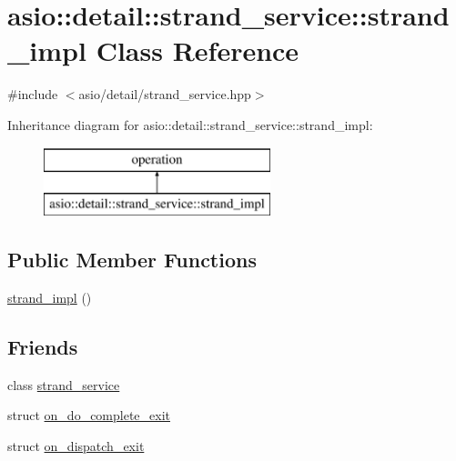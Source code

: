\hypertarget{classasio_1_1detail_1_1strand__service_1_1strand__impl}{}\section{asio\+:\+:detail\+:\+:strand\+\_\+service\+:\+:strand\+\_\+impl Class Reference}
\label{classasio_1_1detail_1_1strand__service_1_1strand__impl}


{\ttfamily \#include $<$asio/detail/strand\+\_\+service.\+hpp$>$}

Inheritance diagram for asio\+:\+:detail\+:\+:strand\+\_\+service\+:\+:strand\+\_\+impl\+:\begin{figure}[H]
\begin{center}
\leavevmode
\includegraphics[height=2.000000cm]{classasio_1_1detail_1_1strand__service_1_1strand__impl}
\end{center}
\end{figure}
\subsection*{Public Member Functions}
\begin{DoxyCompactItemize}
\item 
\hyperlink{classasio_1_1detail_1_1strand__service_1_1strand__impl_a705fd5ec30f603a563caff35fb90936c}{strand\+\_\+impl} ()
\end{DoxyCompactItemize}
\subsection*{Friends}
\begin{DoxyCompactItemize}
\item 
class \hyperlink{classasio_1_1detail_1_1strand__service_1_1strand__impl_a1277f3ace68e6c0bc027b130c8885364}{strand\+\_\+service}
\item 
struct \hyperlink{classasio_1_1detail_1_1strand__service_1_1strand__impl_ae2c4b404800934e49953061db0c7cbb3}{on\+\_\+do\+\_\+complete\+\_\+exit}
\item 
struct \hyperlink{classasio_1_1detail_1_1strand__service_1_1strand__impl_ac356aaab6ba72db1ed853286c2afee93}{on\+\_\+dispatch\+\_\+exit}
\end{DoxyCompactItemize}


